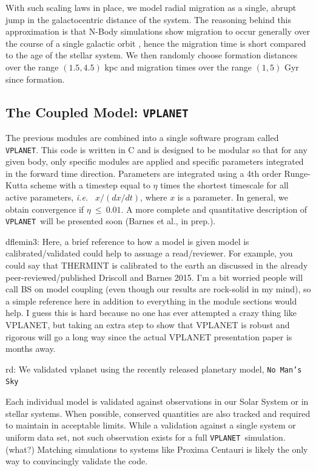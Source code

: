 \documentclass[preprint,12pt]{aastex}
\newcommand{\xxx}[1]{{\color{red} #1}} %
\def\ie{{\it i.e.\ }}
\def\vplanet{\texttt{\footnotesize{VPLANET}}\xspace}
\begin{document}
With such scaling laws in place, we model radial migration 
as a single, abrupt jump in the galactocentric distance of the 
system. The reasoning behind this approximation is that N-Body 
simulations show migration to occur generally over the 
course of a single galactic orbit \cite{Roskar2010}, hence the 
migration time is short compared to the age of the stellar system.
We then randomly choose formation distances over the range 
$(1.5,4.5)$ kpc and migration times over the range $(1,5)$ Gyr 
since formation.

\subsection{The Coupled Model: \vplanet}
\label{sec:models:vplanet}
The previous modules are combined into a single software program
called \vplanet. This code is written in C and is designed to be
modular so that for any given body, only specific modules are applied
and specific parameters integrated in the forward time direction. 
Parameters are integrated
using a 4th order Runge-Kutta scheme with a timestep equal to $\eta$
times the shortest timescale for all active parameters, \ie
$x/(dx/dt)$, where $x$ is a parameter. In general, we obtain convergence if
$\eta~\le~0.01$. A more complete and quantitative description of
\vplanet~will be presented soon (Barnes et al., in prep.). 

\xxx{dflemin3: Here, a brief reference to how a model is given model is calibrated/validated
could help to assuage a read/reviewer.  For example, you could say that THERMINT is calibrated
to the earth an discussed in the already peer-reviewed/published Driscoll and Barnes 2015.  I'm a bit 
worried people will call BS on model coupling (even though our results are rock-solid in my mind), so
a simple reference here in addition to everything in the module sections would help.  I guess this is hard because
no one has ever attempted a crazy thing like VPLANET, but taking an extra step to show that VPLANET is robust
and rigorous will go a long way since the actual VPLANET presentation paper is months away.}

\xxx{rd: We validated vplanet using the recently released planetary model, \texttt{No Man's Sky}}

Each individual model is validated against observations in our Solar
System or in stellar systems. When possible, conserved quantities are
also tracked and \xxx{required to maintain in acceptable limits}. \xxx{While a
validation against a single system or uniform data set, not such
observation exists for a full \vplanet~simulation. (what?)} Matching
simulations to systems like Proxima Centauri is likely the only way to
\xxx{convincingly} validate the code.
\end{document}
